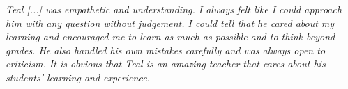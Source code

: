 \documentclass[11pt]{article}
\begin{document}
{\begin{displayquote}
	\textit{Teal [...] was empathetic and understanding. I always felt like I could approach him with any question without judgement. I could tell that he cared about my learning and encouraged me to learn as much as possible and to think beyond grades. He also handled his own mistakes carefully and was always open to criticism. It is obvious that Teal is an amazing teacher that cares about his students' learning and experience.}
\end{displayquote}

}
\end{document}
